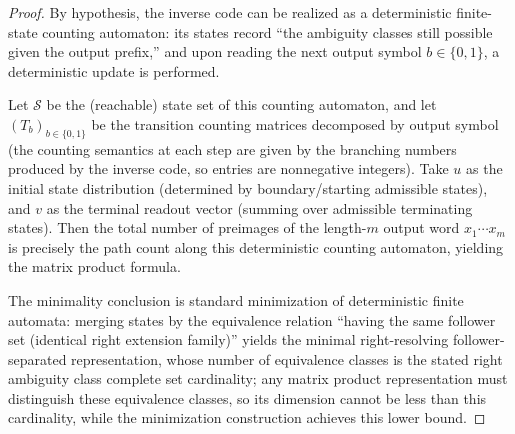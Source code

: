 \begin{proof}
By hypothesis, the inverse code can be realized as a deterministic finite-state counting automaton: its states record ``the ambiguity classes still possible given the output prefix,'' and upon reading the next output symbol \(b\in\{0,1\}\), a deterministic update is performed.

Let \(\mathcal S\) be the (reachable) state set of this counting automaton, and let \((T_b)_{b\in\{0,1\}}\) be the transition counting matrices decomposed by output symbol (the counting semantics at each step are given by the branching numbers produced by the inverse code, so entries are nonneg\-ative integers).
Take \(u\) as the initial state distribution (determined by boundary/starting admissible states), and \(v\) as the terminal readout vector (summing over admissible terminating states). Then the total number of preimages of the length-\(m\) output word \(x_1\cdots x_m\) is precisely the path count along this deterministic counting automaton, yielding the matrix product formula.
\par
The minimality conclusion is standard minimization of deterministic finite automata: merging states by the equivalence relation ``having the same follower set (identical right extension family)'' yields the minimal right-resolving follower-separated representation, whose number of equivalence classes is the stated right ambiguity class complete set cardinality; any matrix product representation must distinguish these equivalence classes, so its dimension cannot be less than this cardinality, while the minimization construction achieves this lower bound.
\end{proof}

